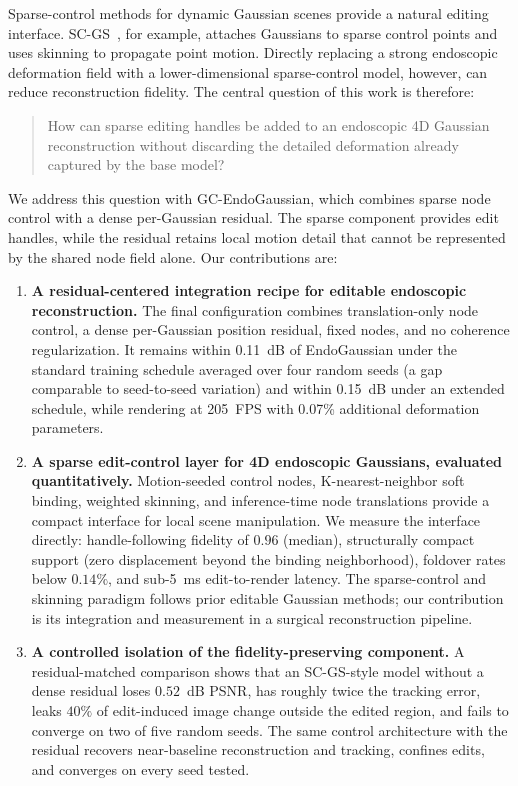 \documentclass[AMA,Times1COL]{WileyNJDv5} %
\begin{document}
Sparse-control methods for dynamic Gaussian scenes provide a natural editing interface. SC-GS~\cite{huang2024scgs}, for example, attaches Gaussians to sparse control points and uses skinning to propagate point motion. Directly replacing a strong endoscopic deformation field with a lower-dimensional sparse-control model, however, can reduce reconstruction fidelity. The central question of this work is therefore:

\begin{quote}
How can sparse editing handles be added to an endoscopic 4D Gaussian reconstruction without discarding the detailed deformation already captured by the base model?
\end{quote}

We address this question with GC-EndoGaussian, which combines sparse node control with a dense per-Gaussian residual. The sparse component provides edit handles, while the residual retains local motion detail that cannot be represented by the shared node field alone. Our contributions are:

\begin{enumerate}[1.]
\item \textbf{A residual-centered integration recipe for editable endoscopic reconstruction.} The final configuration combines translation-only node control, a dense per-Gaussian position residual, fixed nodes, and no coherence regularization. It remains within 0.11~dB of EndoGaussian under the standard training schedule averaged over four random seeds (a gap comparable to seed-to-seed variation) and within 0.15~dB under an extended schedule, while rendering at 205~FPS with 0.07\% additional deformation parameters.

\item \textbf{A sparse edit-control layer for 4D endoscopic Gaussians, evaluated quantitatively.} Motion-seeded control nodes, K-nearest-neighbor soft binding, weighted skinning, and inference-time node translations provide a compact interface for local scene manipulation. We measure the interface directly: handle-following fidelity of $0.96$ (median), structurally compact support (zero displacement beyond the binding neighborhood), foldover rates below $0.14\%$, and sub-5~ms edit-to-render latency. The sparse-control and skinning paradigm follows prior editable Gaussian methods; our contribution is its integration and measurement in a surgical reconstruction pipeline.

\item \textbf{A controlled isolation of the fidelity-preserving component.} A residual-matched comparison shows that an SC-GS-style model without a dense residual loses $0.52$~dB PSNR, has roughly twice the tracking error, leaks $40\%$ of edit-induced image change outside the edited region, and fails to converge on two of five random seeds. The same control architecture with the residual recovers near-baseline reconstruction and tracking, confines edits, and converges on every seed tested.
\end{enumerate}
\end{document}
